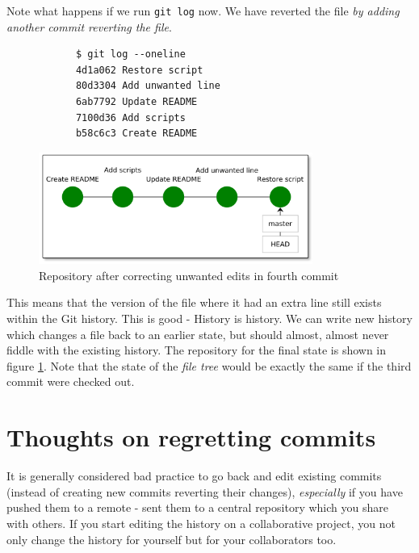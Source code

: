 \documentclass[../main/git_course_main.tex]{subfiles}
\begin{document}
	Note what happens if we run \verb$git log$ now. We have reverted the file \textit{by adding another commit reverting the file}.
	
	\begin{codebox}
		\begin{lstlisting}
			$ git log --oneline
			4d1a062 Restore script
			80d3304 Add unwanted line
			6ab7792 Update README
			7100d36 Add scripts
			b58c6c3 Create README
		\end{lstlisting}
	\end{codebox}
	
	\begin{figure}[h!]
		\centering
		\includegraphics[width=0.8\textwidth]{../visualizations/chapter3/c32_fixed_unwanted_changes.pdf}
		\caption{Repository after correcting unwanted edits in fourth commit}
		\label{fig:correcting_unwanted_changes}
	\end{figure}
	
	This means that the version of the file where it had an extra line still exists within the Git history. This is good - History is history. We can write new history which changes a file back to an earlier state, but should almost, almost never fiddle with the existing history. The repository for the final state is shown in figure \ref{fig:correcting_unwanted_changes}. Note that the state of the \textit{file tree} would be exactly the same if the third commit were checked out.
	
	\section{Thoughts on regretting commits}
	
	It is generally considered bad practice to go back and edit existing commits (instead of creating new commits reverting their changes), \textit{especially} if you have pushed them to a remote - sent them to a central repository which you share with others.
	If you start editing the history on a collaborative project, you not only change the history for yourself but for your collaborators too.
	
\end{document}
